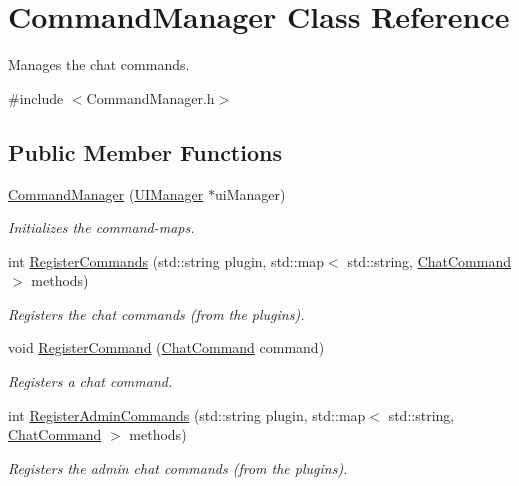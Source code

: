 \hypertarget{classCommandManager}{\section{Command\-Manager Class Reference}
\label{classCommandManager}
}


Manages the chat commands.  




{\ttfamily \#include $<$Command\-Manager.\-h$>$}

\subsection*{Public Member Functions}
\begin{DoxyCompactItemize}
\item 
\hyperlink{classCommandManager_a4720cf5ae3c3a5744ce0497609529201}{Command\-Manager} (\hyperlink{classUIManager}{U\-I\-Manager} $\ast$ui\-Manager)
\begin{DoxyCompactList}\small\item\em Initializes the command-\/maps. \end{DoxyCompactList}\item 
int \hyperlink{classCommandManager_ae5fd4d49aa57f6e764721dea41757668}{Register\-Commands} (std\-::string plugin, std\-::map$<$ std\-::string, \hyperlink{structChatCommand}{Chat\-Command} $>$ methods)
\begin{DoxyCompactList}\small\item\em Registers the chat commands (from the plugins). \end{DoxyCompactList}\item 
void \hyperlink{classCommandManager_a6de4460ec73602e0a650bf8650365c82}{Register\-Command} (\hyperlink{structChatCommand}{Chat\-Command} command)
\begin{DoxyCompactList}\small\item\em Registers a chat command. \end{DoxyCompactList}\item 
int \hyperlink{classCommandManager_a2c4267f0865407f6743408b0243d5bb3}{Register\-Admin\-Commands} (std\-::string plugin, std\-::map$<$ std\-::string, \hyperlink{structChatCommand}{Chat\-Command} $>$ methods)
\begin{DoxyCompactList}\small\item\em Registers the admin chat commands (from the plugins). \end{DoxyCompactList}\item 

\end{DoxyCompactItemize}
